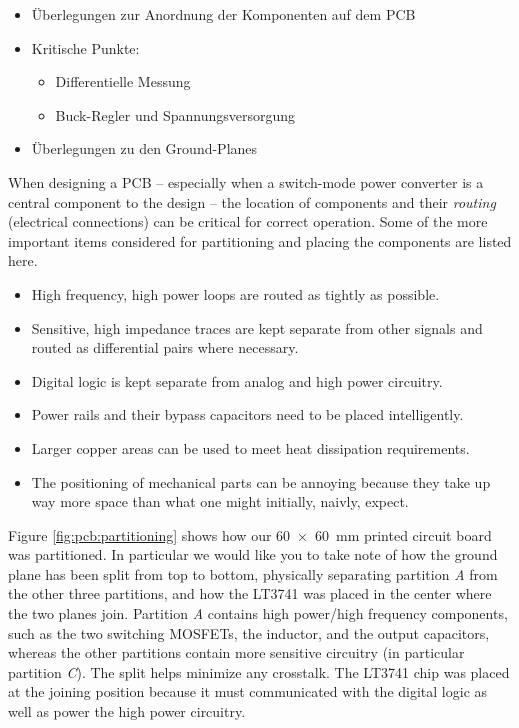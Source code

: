 \begin{itemize}
    \item
        \"Uberlegungen zur Anordnung der Komponenten auf dem PCB
    \item
        Kritische Punkte:
        \begin{itemize}
            \item
                Differentielle Messung
            \item
                Buck-Regler und Spannungsversorgung
        \end{itemize}
    \item
        \"Uberlegungen zu den Ground-Planes
\end{itemize}

When designing a PCB --  especially  when  a  switch-mode  power  converter is a
central  component  to  the  design  --  the  location  of  components and their
\emph{routing} (electrical  connections)  can be critical for correct operation.
Some of the more important  items  considered  for  partitioning and placing the
components are listed here.
\begin{itemize}
    \item
        High frequency, high power loops are routed as tightly as possible.
    \item
        Sensitive, high impedance traces are kept separate from other signals
        and routed as differential pairs where necessary.
    \item
        Digital logic is kept separate from analog and high power circuitry.
    \item
        Power rails and their bypass capacitors need to be placed intelligently.
    \item
        Larger copper areas can be used to meet heat dissipation requirements.
    \item
        The positioning of mechanical parts can be annoying because they take up
        way more space than what one might initially, naivly, expect.
\end{itemize}

Figure \ref{fig:pcb:partitioning} shows how our \SI{60x60}{\milli\meter} printed
circuit board was partitioned. In particular we  would  like you to take note of
how the ground plane has been split from  top  to  bottom, physically separating
partition  \emph{A}  from the other three partitions, and  how  the  LT3741  was
placed in the center where the two planes join. Partition \emph{A} contains high
power/high  frequency  components,  such  as  the  two  switching  MOSFETs,  the
inductor, and the output capacitors, whereas  the  other partitions contain more
sensitive circuitry (in particular partition \emph{C}). The split helps minimize
any crosstalk. The LT3741 chip was placed at the  joining  position  because  it
must  communicated  with  the  digital logic as well as  power  the  high  power
circuitry.


